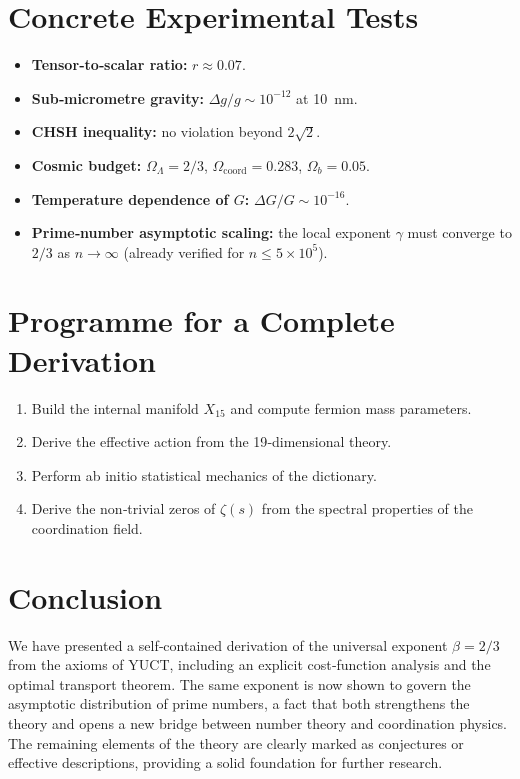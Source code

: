 \documentclass[12pt,a4paper]{article}
\newcommand{\coord}{\mathrm{coord}}
\begin{document}
	\section{Concrete Experimental Tests}
	\begin{itemize}
		\item \textbf{Tensor‑to‑scalar ratio:} \(r \approx 0.07\).
		\item \textbf{Sub‑micrometre gravity:} \(\Delta g/g \sim 10^{-12}\) at 10~nm.
		\item \textbf{CHSH inequality:} no violation beyond \(2\sqrt{2}\).
		\item \textbf{Cosmic budget:} \(\Omega_\Lambda = 2/3\), \(\Omega_{\coord} = 0.283\), \(\Omega_b = 0.05\).
		\item \textbf{Temperature dependence of \(G\):} \(\Delta G/G \sim 10^{-16}\).
		\item \textbf{Prime‑number asymptotic scaling:} the local exponent \(\gamma\) must converge to \(2/3\) as \(n\to\infty\) (already verified for \(n\le 5\times10^5\)).
	\end{itemize}
	
	\section{Programme for a Complete Derivation}
	\begin{enumerate}
		\item Build the internal manifold \(X_{15}\) and compute fermion mass parameters.
		\item Derive the effective action from the 19‑dimensional theory.
		\item Perform ab initio statistical mechanics of the dictionary.
		\item Derive the non‑trivial zeros of \(\zeta(s)\) from the spectral properties of the coordination field.
	\end{enumerate}
	
	\section{Conclusion}
	We have presented a self‑contained derivation of the universal exponent \(\beta = 2/3\) from the axioms of YUCT, including an explicit cost‑function analysis and the optimal transport theorem.  The same exponent is now shown to govern the asymptotic distribution of prime numbers, a fact that both strengthens the theory and opens a new bridge between number theory and coordination physics.  The remaining elements of the theory are clearly marked as conjectures or effective descriptions, providing a solid foundation for further research.
	
\end{document}
